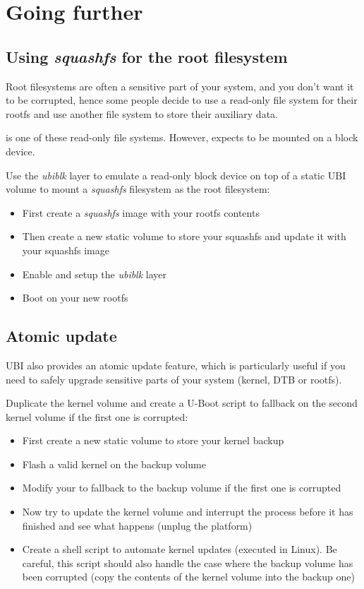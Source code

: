 \section{Going further}

\subsection{Using {\em squashfs} for the root filesystem}

Root filesystems are often a sensitive part of your system, and you don't
want it to be corrupted, hence some people decide to use a read-only
file system for their rootfs and use another file system to store their
auxiliary data.

 is one of these read-only file systems. However,
 expects to be mounted on a block device.

Use the {\em ubiblk} layer to emulate a read-only block device on top
of a static UBI volume to mount a {\em squashfs} filesystem as the
root filesystem:

\begin{itemize}
  \item First create a {\em squashfs} image with your rootfs contents
  \item Then create a new static volume to store your squashfs and update it with
    your squashfs image
  \item Enable and setup the {\em ubiblk} layer
  \item Boot on your new rootfs
\end{itemize}


\subsection{Atomic update}

UBI also provides an atomic update feature, which is particularly useful
if you need to safely upgrade sensitive parts of your system (kernel,
DTB or rootfs).

Duplicate the kernel volume and create a U-Boot script to fallback on
the second kernel volume if the first one is corrupted:
\begin{itemize}
  \item First create a new static volume to store your kernel backup
  \item Flash a valid kernel on the backup volume
  \item Modify your  to fallback to the backup volume if the first one
    is corrupted
  \item Now try to update the kernel volume and interrupt the process before
    it has finished and see what happens (unplug the platform)
  \item Create a shell script to automate kernel updates (executed in Linux).
    Be careful, this script should also handle the case where the backup
    volume has been corrupted (copy the contents of the kernel volume into
    the backup one)
\end{itemize}

